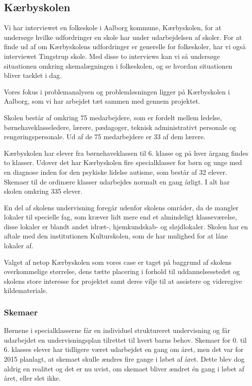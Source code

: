 \subsection{Kærbyskolen}
\label{Kaerbyskolen}
Vi har interviewet en folkeskole i Aalborg kommune, Kærbyskolen, for at undersøge hvilke udfordringer en skole har under udarbejdelsen af skoler. For at finde ud af om Kærbyskolens udfordringer er generelle for folkeskoler, har vi også interviewet Tingstrup skole. Med disse to interviews kan vi så undersøge situationen omkring skemalægningen i folkeskolen, og se hvordan situationen bliver tacklet i dag.


Vores fokus i problemanalysen og problemløsningen ligger på Kærbyskolen i Aalborg, som vi har arbejdet tæt sammen med gennem projektet.

Skolen består af omkring 75 medarbejdere, som er fordelt mellem ledelse, børnehaveklasseledere, lærere, pædagoger, teknisk administrativt personale og rengøringspersonale. Ud af de 75 medarbejdere er 33 af dem lærere.

Kærbyskolen har elever fra børnehaveklassen til 6. klasse og på hver årgang findes to klasser. Udover det har Kærbyskolen fire specialklasser for børn og unge med en diagnose inden for den psykiske lidelse autisme, som består af 32 elever. Skemaer til de ordinære klasser udarbejdes normalt en gang årligt. I alt har skolen omkring 335 elever.

En del af skolens undervisning foregår udenfor skolens områder, da de mangler lokaler til specielle fag, som kræver lidt mere end et almindeligt klasseværelse, disse lokaler er blandt andet idræt-, hjemkundskab- og sløjdlokaler. Skolen har en aftale med den institutionen Kulturskolen, som de har mulighed for at låne lokaler af.

Valget af netop Kærbyskolen som vores case er taget på baggrund af skolens overkommelige størrelse, dens tætte placering i forhold til uddannelsesstedet og skolens store interesse for projektet samt deres vilje til at assistere og videregive kildemateriale.

\subsubsection{Skemaer}
\label{Skemaer}
Børnene i specialklasserne får en individuel struktureret undervisning og får udarbejdet en undervisningsplan tilrettet til hvert barns behov\cite{j_klasser}.
Skemaer for 0. til 6. klasses elever har tidligere været udarbejdet en gang om året, men det var for 2015 planlagt, at skemaet skulle ændres fire gange i løbet af året. Dette blev dog aldrig en realitet og det er nu uvist, om skemaet bliver ændret \'en gang i løbet af året, eller slet ikke.

